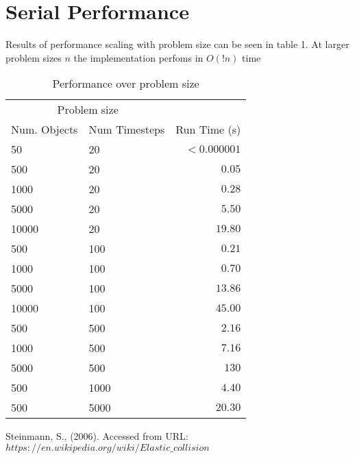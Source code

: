 \documentclass[twoside,twocolumn]{article}
\begin{document}
	\section{Serial Performance}
	Results of performance scaling with problem size can be seen in table 1. At larger problem sizes $n$ the implementation perfoms in $O(!n)$ time \newline
	\begin{table}
		\caption{Performance over problem size}
		\centering
		\begin{tabular}{llr}
			\toprule
			\multicolumn{2}{c}{Problem size} \\
			\cmidrule(r){1-2}
			Num. Objects & Num Timesteps & Run Time (s) \\
			\midrule
			50 & 20 & $< 0.000001$ \\
			500 & 20 & $0.05$ \\
			1000 & 20 & $0.28$ \\
			5000 & 20 & $5.50$ \\
			10000 & 20 & $19.80$ \\
			500 & 100 & $0.21$ \\
			1000 & 100 & $0.70$ \\
			5000 & 100 & $13.86$ \\
			10000 & 100 & $45.00$ \\
			500 & 500 & $2.16$ \\
			1000 & 500 & $7.16$ \\
			5000 & 500 & $130$ \\
			500 & 1000 & $4.40$ \\
			500 & 5000 & $20.30$ \\
			\bottomrule
		\end{tabular}
	\end{table}	
	
	
	\begin{thebibliography}{99} %
		
		Steinmann, S., (2006).
		\newline Accessed from URL:\newline $https://en.wikipedia.org/wiki/Elastic\_collision$
		
	\end{thebibliography}
	
	
\end{document}
